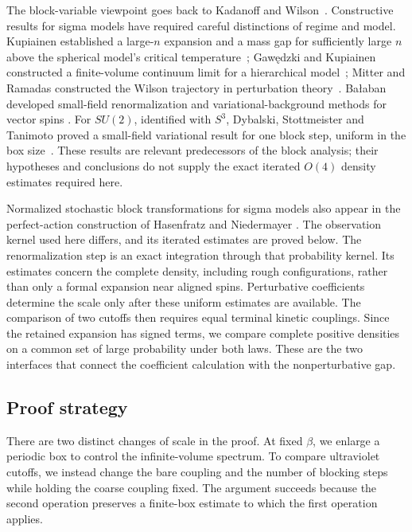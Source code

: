 The block-variable viewpoint goes back to Kadanoff and
Wilson~\cite{Kadanoff,Wilson}. Constructive results for sigma models have
required careful distinctions of regime and model. Kupiainen established
a large-$n$ expansion and a mass gap for sufficiently large $n$ above the
spherical model's critical temperature~\cite{Kupiainen}; Gaw\k{e}dzki and
Kupiainen constructed a finite-volume continuum limit for a hierarchical
model~\cite{GawedzkiKupiainen}; Mitter and
Ramadas constructed the Wilson trajectory in perturbation
 theory~\cite{MitterRamadas}. Ba\l aban developed small-field
renormalization and variational-background methods for vector spins
\cite{BalabanFlow,BalabanVariational}. For $SU(2)$, identified with $S^3$,
Dybalski, Stottmeister and Tanimoto proved a small-field
variational result for one block step, uniform in the box size~\cite{DybalskiStottmeisterTanimotoVariational}.
These results are relevant predecessors of the block analysis; their
hypotheses and conclusions do not supply the exact iterated $O(4)$
density estimates required here.

Normalized stochastic block transformations for sigma models also appear
in the perfect-action construction of Hasenfratz and Niedermayer
\cite[Section~2.1, Eqs.~(3)--(5)]{HasenfratzNiedermayerPerfect1994}.
The observation kernel used here differs, and its iterated estimates
are proved below. The renormalization step is an exact integration
through that probability kernel. Its estimates concern the complete density, including
rough configurations, rather than only a formal expansion near aligned
spins. Perturbative coefficients determine the scale only after these
uniform estimates are available. The comparison of two cutoffs then
requires equal terminal kinetic couplings. Since the retained expansion
has signed terms, we compare complete positive densities on a common
set of large probability under both laws. These are the two interfaces
that connect the coefficient calculation with the nonperturbative gap.

\subsection{Proof strategy}

There are two distinct changes of scale in the proof. At fixed $\beta$,
we enlarge a periodic box to control the infinite-volume spectrum.
To compare ultraviolet cutoffs, we instead change the bare coupling
and the number of blocking steps while holding the coarse coupling
fixed. The argument succeeds because the second operation preserves a
finite-box estimate to which the first operation applies.

